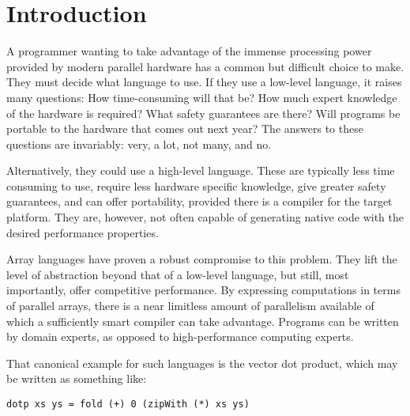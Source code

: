 \chapter{Introduction}



A programmer wanting to take advantage of the immense processing power provided by modern parallel hardware has a common but difficult choice to make. They must decide what language to use. If they use a low-level language, it raises many questions: How time-consuming will that be? How much expert knowledge of the hardware is required?  What safety guarantees are there? Will programs be portable to the hardware that comes out next year? The answers to these questions are invariably: very, a lot, not many, and no.

Alternatively, they could use a high-level language. These are typically less time consuming to use, require less hardware specific knowledge, give greater safety guarantees, and can offer portability, provided there is a compiler for the target platform. They are, however, not often capable of generating native code with the desired performance properties.

Array languages have proven a robust compromise to this problem. They lift the level of abstraction beyond that of a low-level language, but still, most importantly, offer competitive performance. By expressing computations in terms of parallel arrays, there is a near limitless amount of parallelism available of which a sufficiently smart compiler can take advantage. Programs can be written by domain experts, as opposed to high-performance computing experts.

That canonical example for such languages is the vector dot product, which may be written as something like:

\begin{lstlisting}
dotp xs ys = fold (+) 0 (zipWith (*) xs ys)
\end{lstlisting}

